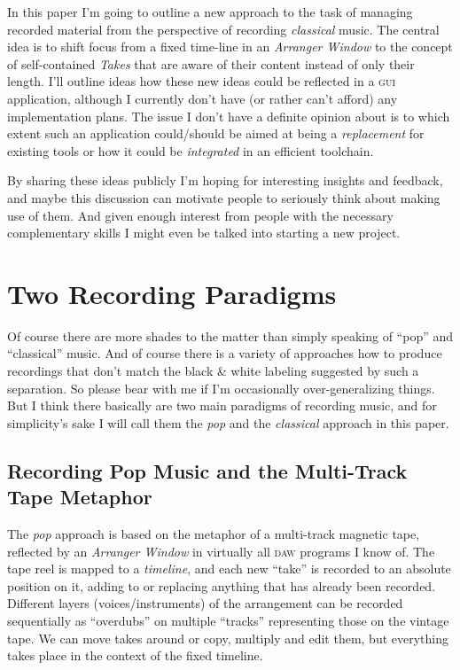 \documentclass[11pt,a4paper]{article}
\begin{document}
In this paper I'm going to outline a new approach to the task of managing recorded material from the perspective of recording \emph{classical} music.
The central idea is to shift focus from a fixed time-line in an \emph{Arranger Window} to the concept of self-contained \emph{Takes} that are aware of their content instead of only their length.
I'll outline ideas how these new ideas could be reflected in a \textsc{gui} application, although I currently don't have (or rather can't afford) any implementation plans.
The issue I don't have a definite opinion about is to which extent such an application could/should be aimed at being a \emph{replacement} for existing tools or how it could be \emph{integrated} in an efficient toolchain.

By sharing these ideas publicly I'm hoping for interesting insights and feedback, and maybe this discussion can motivate people to seriously think about making use of them.
And given enough interest from people with the necessary complementary skills I might even be talked into starting a new project.

\section{Two Recording Paradigms}

Of course there are more shades to the matter  than simply speaking of “pop” and “classical” music.
And of course there is a variety of approaches how to produce recordings that don't match the black \& white labeling suggested by such a separation.
So please bear with me if I'm occasionally over-generalizing things.
But I think there basically are two main paradigms of recording music, and for simplicity's sake I will call them the \emph{pop} and the \emph{classical} approach in this paper.

\subsection{Recording Pop Music and the Multi-Track Tape Metaphor}

The \emph{pop} approach is based on the metaphor of a multi-track magnetic tape, reflected by an \emph{Arranger Window} in virtually all \textsc{daw} programs I know of.
The tape reel is mapped to a \emph{timeline}, and each new “take” is recorded to an absolute position on it, adding to or replacing anything that has already been recorded.
Different layers (voices/instruments) of the arrangement can be recorded sequentially as “overdubs” on multiple “tracks” representing those on the vintage tape.
We can move takes around or copy, multiply and edit them, but everything takes place in the context of the fixed timeline.
\end{document}
